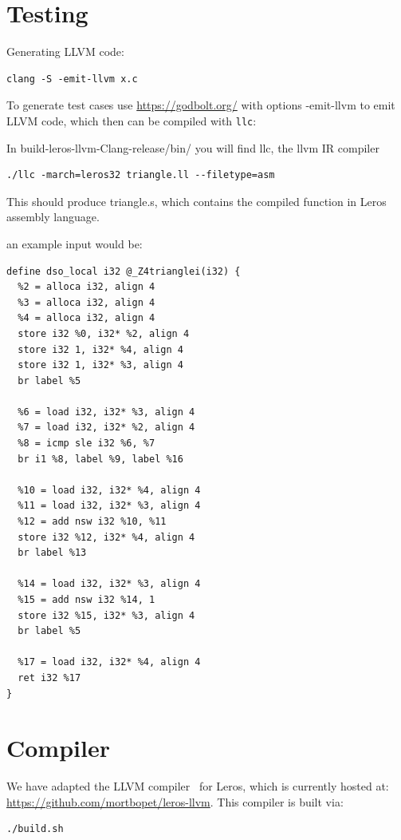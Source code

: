 \documentclass[a4paper,fontsize=10pt,twoside,DIV15,BCOR12mm,headinclude=true,footinclude=false,pagesize,bibtotoc]{scrbook}
\newcommand{\code}[1]{{\small{\texttt{#1}}}}
\begin{document}
\chapter{Testing}

Generating LLVM code:

\begin{verbatim}
clang -S -emit-llvm x.c
\end{verbatim}

To generate test cases use \url{https://godbolt.org/} with options -emit-llvm to emit LLVM code,
which then can be compiled with \code{llc}:

In build-leros-llvm-Clang-release/bin/ you will find llc, the llvm IR compiler

\begin{verbatim}
./llc -march=leros32 triangle.ll --filetype=asm
\end{verbatim}
This should produce triangle.s, which contains the compiled function in Leros assembly language. 

an example input would be:

\begin{verbatim}
define dso_local i32 @_Z4trianglei(i32) {
  %2 = alloca i32, align 4
  %3 = alloca i32, align 4
  %4 = alloca i32, align 4
  store i32 %0, i32* %2, align 4
  store i32 1, i32* %4, align 4
  store i32 1, i32* %3, align 4
  br label %5

  %6 = load i32, i32* %3, align 4
  %7 = load i32, i32* %2, align 4
  %8 = icmp sle i32 %6, %7
  br i1 %8, label %9, label %16

  %10 = load i32, i32* %4, align 4
  %11 = load i32, i32* %3, align 4
  %12 = add nsw i32 %10, %11
  store i32 %12, i32* %4, align 4
  br label %13

  %14 = load i32, i32* %3, align 4
  %15 = add nsw i32 %14, 1
  store i32 %15, i32* %3, align 4
  br label %5

  %17 = load i32, i32* %4, align 4
  ret i32 %17
}
\end{verbatim}

\chapter{Compiler}

We have adapted the LLVM compiler~\cite{llvm:2004} for Leros, which is currently hosted at:
\url{https://github.com/mortbopet/leros-llvm}. This compiler is built via:

\begin{verbatim}
./build.sh
\end{verbatim}
\end{document}
